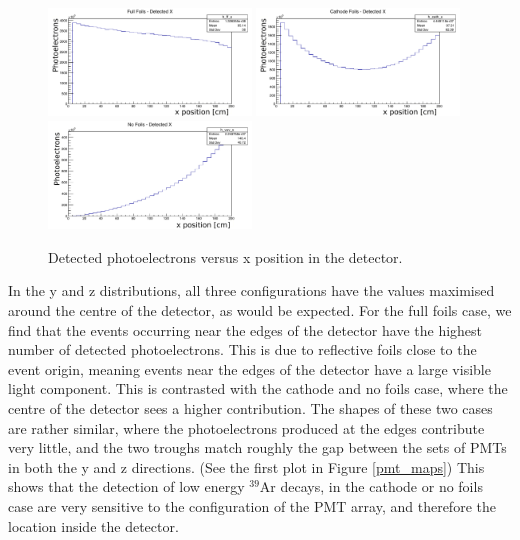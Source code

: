 \documentclass[a4paper]{article}
\begin{document}
  \begin{figure}[H]
    \center
    \includegraphics[width=0.48\textwidth]{detected_fullfoils_x_labels.pdf}
    \includegraphics[width=0.48\textwidth]{detected_cathode_x_labels.pdf}
    \includegraphics[width=0.48\textwidth]{detected_nofoils_x_labels.pdf}
    \caption{Detected photoelectrons versus x position in the detector.}\label{x_pos}
  \end{figure}
  
  In the y and z distributions, all three configurations have the values maximised around the centre of the detector, as would be expected. For the full foils case, we find that the events occurring near the edges of the detector have the highest number of detected photoelectrons. This is due to reflective foils close to the event origin, meaning events near the edges of the detector have a large visible light component. This is contrasted with the cathode and no foils case, where the centre of the detector sees a higher contribution. The shapes of these two cases are rather similar, where the photoelectrons produced at the edges contribute very little, and the two troughs match roughly the gap between the sets of PMTs in both the y and z directions. (See the first plot in Figure \ref{pmt_maps}) This shows that the detection of low energy $^{39}$Ar decays, in the cathode or no foils case are very sensitive to the configuration of the PMT array, and therefore the location inside the detector.
  
\end{document}
